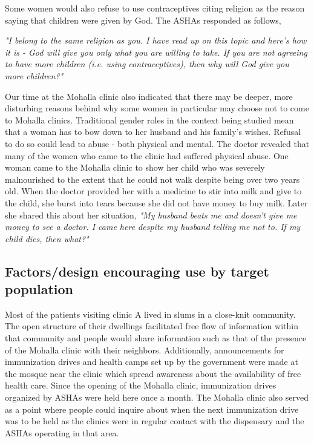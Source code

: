 Some women would also refuse to use contraceptives citing religion as the reason saying that children were given by God. The ASHAs responded as follows,

\textit{"I belong to the same religion as you. I have read up on this topic and here's how it is - God will give you only what you are willing to take. If you are not agreeing to have more children (i.e. using contraceptives), then why will God give you more children?"}

Our time at the Mohalla clinic also indicated that there may be deeper, more disturbing reasons behind why some women in particular may choose not to come to Mohalla clinics. Traditional gender roles in the context being studied mean that a woman has to bow down to her husband and his family's wishes. Refusal to do so could lead to abuse - both physical and mental. The doctor revealed that many of the women who came to the clinic had suffered physical abuse. One woman came to the Mohalla clinic to show her child who was severely malnourished to the extent that he could not walk despite being over two years old. When the doctor provided her with a medicine to stir into milk and give to the child, she burst into tears because she did not have money to buy milk. Later she shared this about her situation, \textit{"My husband beats me and doesn’t give me money to see a doctor. I came here despite my husband telling me not to. If my child dies, then what?"}

\subsection{Factors/design encouraging use by target population}
Most of the patients visiting clinic A lived in slums in a close-knit community. The open structure of their dwellings facilitated free flow of information within that community and people would share information such as that of the presence of the Mohalla clinic with their neighbors. Additionally, announcements for immunization drives and health camps set up by the government were made at the mosque near the clinic which spread awareness about the availability of free health care. Since the opening of the Mohalla clinic, immunization drives organized by ASHAs were held here once a month. The Mohalla clinic also served as a point where people could inquire about when the next immunization drive was to be held as the clinics were in regular contact with the dispensary and the ASHAs operating in that area.

